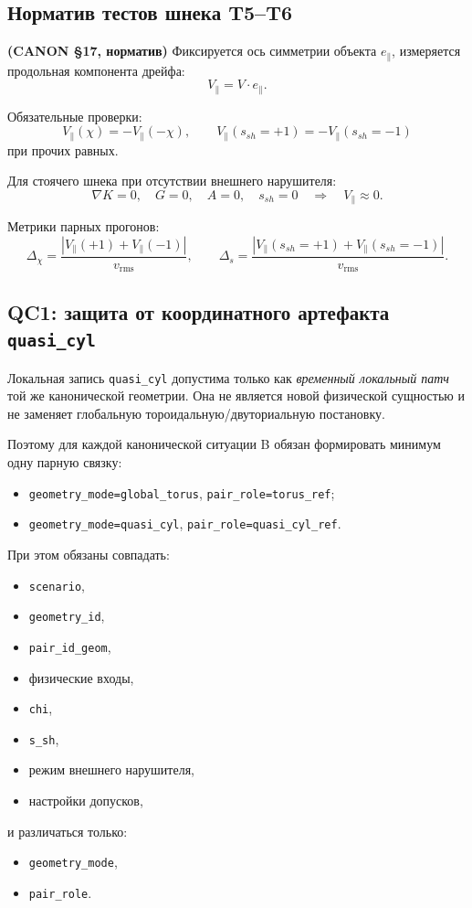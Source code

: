 \subsection{Норматив тестов шнека T5--T6}

\textbf{(CANON \S17, норматив)} Фиксируется ось симметрии объекта $e_\parallel$,
измеряется продольная компонента дрейфа:
\[
V_\parallel = V\cdot e_\parallel .
\]

Обязательные проверки:
\[
V_\parallel(\chi)=-V_\parallel(-\chi),
\qquad
V_\parallel(s_{sh}=+1)=-V_\parallel(s_{sh}=-1)
\]
при прочих равных.

Для стоячего шнека при отсутствии внешнего нарушителя:
\[
\nabla K=0,\quad G=0,\quad A=0,\quad s_{sh}=0
\quad \Longrightarrow \quad
V_\parallel\approx 0.
\]

Метрики парных прогонов:
\[
\Delta_\chi=\frac{|V_\parallel(+1)+V_\parallel(-1)|}{v_{\mathrm{rms}}},
\qquad
\Delta_s=\frac{|V_\parallel(s_{sh}=+1)+V_\parallel(s_{sh}=-1)|}{v_{\mathrm{rms}}}.
\]

\subsection{QC1: защита от координатного артефакта \texttt{quasi\_cyl}}

Локальная запись \texttt{quasi\_cyl} допустима только как \emph{временный локальный патч}
той же канонической геометрии. Она не является новой физической сущностью и не заменяет
глобальную тороидальную/двуториальную постановку.

Поэтому для каждой канонической ситуации B обязан формировать минимум одну парную связку:
\begin{itemize}
\item \texttt{geometry\_mode=global\_torus}, \texttt{pair\_role=torus\_ref};
\item \texttt{geometry\_mode=quasi\_cyl}, \texttt{pair\_role=quasi\_cyl\_ref}.
\end{itemize}

При этом обязаны совпадать:
\begin{itemize}
\item \texttt{scenario},
\item \texttt{geometry\_id},
\item \texttt{pair\_id\_geom},
\item физические входы,
\item \texttt{chi},
\item \texttt{s\_sh},
\item режим внешнего нарушителя,
\item настройки допусков,
\end{itemize}
и различаться только:
\begin{itemize}
\item \texttt{geometry\_mode},
\item \texttt{pair\_role}.
\end{itemize}

